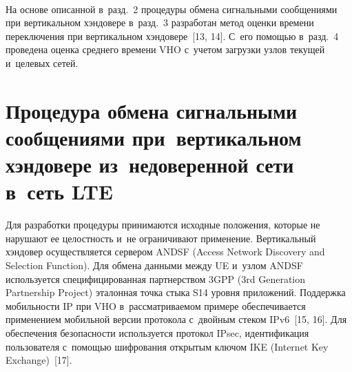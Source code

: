 \begin{multicols}{2}
\begin{figure*}[b] %
\vspace*{6pt}
 \begin{center}
 \mbox{%
 \epsfxsize=131.756mm 
 }
 \end{center}
\vspace*{-9pt}
\end{figure*} 

На основе описанной в~разд.~2 процедуры обмена сигнальными 
сообщениями при вертикальном хэндовере в~разд.~3 разработан метод оценки 
времени переключения при вертикальном хэндовере~[13, 14]. С~его помощью 
в~разд.~4 проведена оценка среднего времени VHO с~учетом загрузки узлов 
текущей и~целевых сетей.



\section{Процедура обмена сигнальными сообщениями 
при~вертикальном хэндовере из~недоверенной сети в~сеть LTE}

  Для разработки процедуры принимаются исходные положения, которые не 
нарушают ее целостность и~не ограничивают применение. Вертикальный 
хэндовер осуществляется сервером ANDSF (Access Network Discovery and 
Selection Function). Для обмена данными между UE и~узлом ANDSF 
используется специфицированная партнерством 3GPP 
(3rd Generation Partnership Project) эталонная точка стыка 
S14 уровня приложений. Поддержка мобильности IP при VHO 
в~рассматриваемом примере обеспечивается применением мобильной версии 
протокола с~двойным стеком IPv6~[15, 16]. Для обеспечения без\-опас\-ности 
используется протокол IPsec, идентификация пользователя с~помощью 
шифрования открытым ключом IKE (Internet Key Exchange)~[17].

\begin{figure*}[b] %
\vspace*{6pt}
 \begin{center}
 \mbox{%
 \epsfxsize=132.09mm 
 }
 \end{center}
\vspace*{-9pt}
\end{figure*}
  

\end{multicols}
